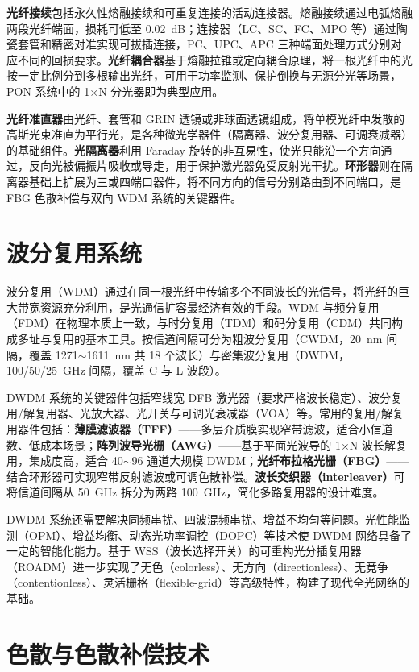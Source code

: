 \documentclass[a4paper,11pt,UTF8,fontset=fandol]{ctexart}
\begin{document}
\textbf{光纤接续}包括永久性熔融接续和可重复连接的活动连接器。熔融接续通过电弧熔融两段光纤端面，损耗可低至 0.02~dB；连接器（LC、SC、FC、MPO 等）通过陶瓷套管和精密对准实现可拔插连接，PC、UPC、APC 三种端面处理方式分别对应不同的回损要求。\textbf{光纤耦合器}基于熔融拉锥或定向耦合原理，将一根光纤中的光按一定比例分到多根输出光纤，可用于功率监测、保护倒换与无源分光等场景，PON 系统中的 1$\times$N 分光器即为典型应用。

\textbf{光纤准直器}由光纤、套管和 GRIN 透镜或非球面透镜组成，将单模光纤中发散的高斯光束准直为平行光，是各种微光学器件（隔离器、波分复用器、可调衰减器）的基础组件。\textbf{光隔离器}利用 Faraday 旋转的非互易性，使光只能沿一个方向通过，反向光被偏振片吸收或导走，用于保护激光器免受反射光干扰。\textbf{环形器}则在隔离器基础上扩展为三或四端口器件，将不同方向的信号分别路由到不同端口，是 FBG 色散补偿与双向 WDM 系统的关键器件。

\section{波分复用系统}

波分复用（WDM）通过在同一根光纤中传输多个不同波长的光信号，将光纤的巨大带宽资源充分利用，是光通信扩容最经济有效的手段\cite{yuanrong2020,ramaswami2009}。WDM 与频分复用（FDM）在物理本质上一致，与时分复用（TDM）和码分复用（CDM）共同构成多址与复用的基本工具。按信道间隔可分为粗波分复用（CWDM，20~nm 间隔，覆盖 1271$\sim$1611~nm 共 18 个波长）与密集波分复用（DWDM，100/50/25~GHz 间隔，覆盖 C 与 L 波段）。

DWDM 系统的关键器件包括窄线宽 DFB 激光器（要求严格波长稳定）、波分复用/解复用器、光放大器、光开关与可调光衰减器（VOA）等。常用的复用/解复用器件包括：\textbf{薄膜滤波器（TFF）}——多层介质膜实现窄带滤波，适合小信道数、低成本场景；\textbf{阵列波导光栅（AWG）}——基于平面光波导的 1$\times$N 波长解复用，集成度高，适合 40$\sim$96 通道大规模 DWDM；\textbf{光纤布拉格光栅（FBG）}——结合环形器可实现窄带反射滤波或可调色散补偿。\textbf{波长交织器（interleaver）}可将信道间隔从 50~GHz 拆分为两路 100~GHz，简化多路复用器的设计难度。

DWDM 系统还需要解决同频串扰、四波混频串扰、增益不均匀等问题。光性能监测（OPM）、增益均衡、动态光功率调控（DOPC）等技术使 DWDM 网络具备了一定的智能化能力。基于 WSS（波长选择开关）的可重构光分插复用器（ROADM）进一步实现了无色（colorless）、无方向（directionless）、无竞争（contentionless）、灵活栅格（flexible-grid）等高级特性，构建了现代全光网络的基础\cite{ramaswami2009}。

\section{色散与色散补偿技术}
\end{document}
